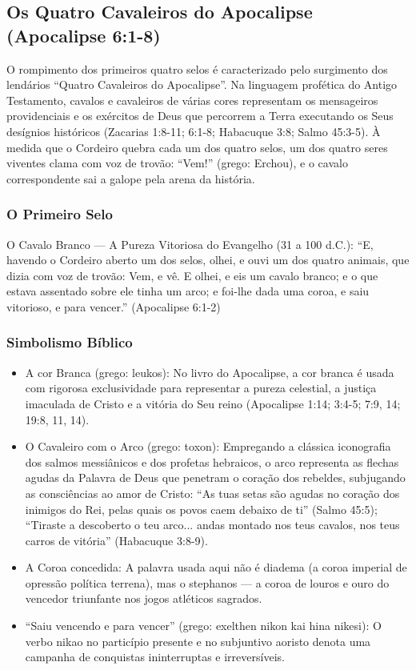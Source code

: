 \documentclass[11pt,a4paper,openany]{book}
\begin{document}
\subsection{Os Quatro Cavaleiros do Apocalipse (Apocalipse 6:1-8)}


O rompimento dos primeiros quatro selos é caracterizado pelo surgimento dos lendários ``Quatro Cavaleiros do Apocalipse''. Na linguagem profética do Antigo Testamento, cavalos e cavaleiros de várias cores representam os mensageiros providenciais e os exércitos de Deus que percorrem a Terra executando os Seus desígnios históricos (Zacarias 1:8-11; 6:1-8; Habacuque 3:8; Salmo 45:3-5). À medida que o Cordeiro quebra cada um dos quatro selos, um dos quatro seres viventes clama com voz de trovão: ``Vem!'' (grego: Erchou), e o cavalo correspondente sai a galope pela arena da história.


\subsubsection*{O Primeiro Selo}
O Cavalo Branco — A Pureza Vitoriosa do Evangelho (31 a 100 d.C.):
``E, havendo o Cordeiro aberto um dos selos, olhei, e ouvi um dos quatro animais, que dizia com voz de trovão: Vem, e vê. E olhei, e eis um cavalo branco; e o que estava assentado sobre ele tinha um arco; e foi-lhe dada uma coroa, e saiu vitorioso, e para vencer.'' (Apocalipse 6:1-2)


\subsubsection*{Simbolismo Bíblico}
\begin{itemize}
  \item A cor Branca (grego: leukos): No livro do Apocalipse, a cor branca é usada com rigorosa exclusividade para representar a pureza celestial, a justiça imaculada de Cristo e a vitória do Seu reino (Apocalipse 1:14; 3:4-5; 7:9, 14; 19:8, 11, 14).
  \item O Cavaleiro com o Arco (grego: toxon): Empregando a clássica iconografia dos salmos messiânicos e dos profetas hebraicos, o arco representa as flechas agudas da Palavra de Deus que penetram o coração dos rebeldes, subjugando as consciências ao amor de Cristo: ``As tuas setas são agudas no coração dos inimigos do Rei, pelas quais os povos caem debaixo de ti'' (Salmo 45:5); ``Tiraste a descoberto o teu arco... andas montado nos teus cavalos, nos teus carros de vitória'' (Habacuque 3:8-9).
  \item A Coroa concedida: A palavra usada aqui não é diadema (a coroa imperial de opressão política terrena), mas o stephanos — a coroa de louros e ouro do vencedor triunfante nos jogos atléticos sagrados.
  \item ``Saiu vencendo e para vencer'' (grego: exelthen nikon kai hina nikesi): O verbo nikao no particípio presente e no subjuntivo aoristo denota uma campanha de conquistas ininterruptas e irreversíveis.
\end{itemize}
\end{document}
